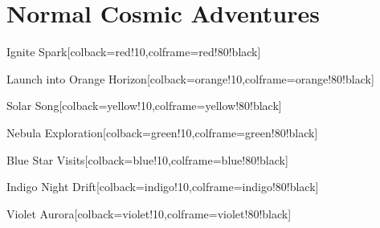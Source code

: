 \documentclass[a6single]{checklist}
\begin{document}
\maketitle

\normalchapter
\section{Normal Cosmic Adventures}

\begin{checklist}{Ignite Spark}[colback=red!10,colframe=red!80!black]
\end{checklist}

\begin{checklist}{Launch into Orange Horizon}[colback=orange!10,colframe=orange!80!black]
\end{checklist}

\begin{checklist}{Solar Song}[colback=yellow!10,colframe=yellow!80!black]
\end{checklist}

\begin{checklist}{Nebula Exploration}[colback=green!10,colframe=green!80!black]
\end{checklist}

\begin{checklist}{Blue Star Visits}[colback=blue!10,colframe=blue!80!black]
\end{checklist}

\begin{checklist}{Indigo Night Drift}[colback=indigo!10,colframe=indigo!80!black]
\end{checklist}

\begin{checklist}{Violet Aurora}[colback=violet!10,colframe=violet!80!black]
\end{checklist}
\end{document}
